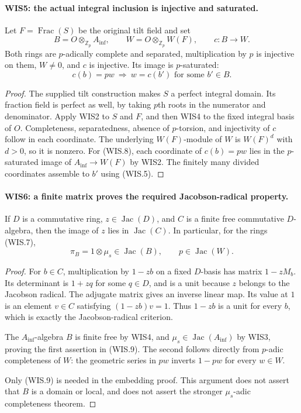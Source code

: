 \documentclass[11pt,a4paper]{article}
\numberwithin{equation}{section}
\theoremstyle{remark}\newtheorem{remark}[theorem]{Remark}
\begin{document}
\paragraph{WIS5: the actual integral inclusion is injective and saturated.}
\label{claim:WIS5}
Let $F=\operatorname{Frac}(S)$ be the original tilt field and set
\[
 B=O\otimes_{\mathbb Z_p}A_{\inf},\qquad
 W=O\otimes_{\mathbb Z_p}W(F),\qquad c:B\longrightarrow W.
                                                               \tag{WIS.7}
\]
Both rings are $p$-adically complete and separated, multiplication
by $p$ is injective on them, $W\ne0$, and $c$ is injective.
Its image is $p$-saturated:
\[
                  c(b)=pw\ \Longrightarrow\
                        w=c(b')\text{ for some }b'\in B.   \tag{WIS.8}
\]

\begin{proof}
The supplied tilt construction makes $S$ a perfect integral
domain. Its fraction field is perfect as well, by taking
$p$th roots in the numerator and denominator. Apply WIS2
to $S$ and $F$, and then WIS4 to the fixed integral basis
of $O$. Completeness, separatedness, absence of $p$-torsion,
and injectivity of $c$ follow in each coordinate.
The underlying $W(F)$-module of $W$ is $W(F)^d$ with
$d>0$, so it is nonzero. For (WIS.8), each coordinate
of $c(b)=pw$ lies in the $p$-saturated image of
$A_{\inf}\to W(F)$ by WIS2. The finitely many divided
coordinates assemble to $b'$ using (WIS.5).
\end{proof}

\paragraph{WIS6: a finite matrix proves the required Jacobson-radical property.}
\label{claim:WIS6}
If $D$ is a commutative ring, $z\in\operatorname{Jac}(D)$,
and $C$ is a finite free commutative $D$-algebra, then
the image of $z$ lies in $\operatorname{Jac}(C)$. In particular,
for the rings (WIS.7),
\[
             \pi_B=1\otimes\mu_s\in\operatorname{Jac}(B),
             \qquad p\in\operatorname{Jac}(W).             \tag{WIS.9}
\]

\begin{proof}
For $b\in C$, multiplication by $1-zb$ on a fixed $D$-basis
has matrix $1-zM_b$. Its determinant is $1+zq$ for some
$q\in D$, and is a unit because $z$ belongs to the Jacobson
radical. The adjugate matrix gives an inverse linear map.
Its value at $1$ is an element $v\in C$ satisfying
$(1-zb)v=1$. Thus $1-zb$ is a unit for every $b$, which
is exactly the Jacobson-radical criterion.

The $A_{\inf}$-algebra $B$ is finite free by WIS4, and
$\mu_s\in\operatorname{Jac}(A_{\inf})$ by WIS3, proving
the first assertion in (WIS.9). The second follows directly
from $p$-adic completeness of $W$: the geometric series
in $pw$ inverts $1-pw$ for every $w\in W$.

Only (WIS.9) is needed in the embedding proof. This argument
does not assert that $B$ is a domain or local, and does not
assert the stronger $\mu_s$-adic completeness theorem.
\end{proof}
\end{document}
